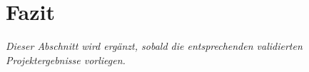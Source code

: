 \section{Fazit}\label{fazit}

\textit{Dieser Abschnitt wird ergänzt, sobald die entsprechenden validierten Projektergebnisse vorliegen.}
